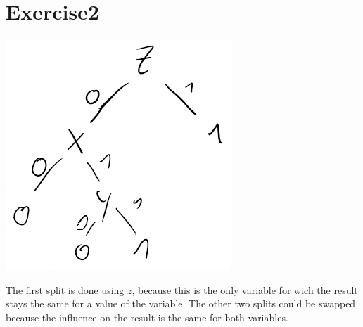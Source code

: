 \section*{Exercise2}
\includegraphics[scale=0.5]{E2Tree.png}

The first split is done using $z$, because this is the only variable for wich the result stays the same for a value of the variable.
The other two splits could be swapped because the influence on the result is the same for both variables.